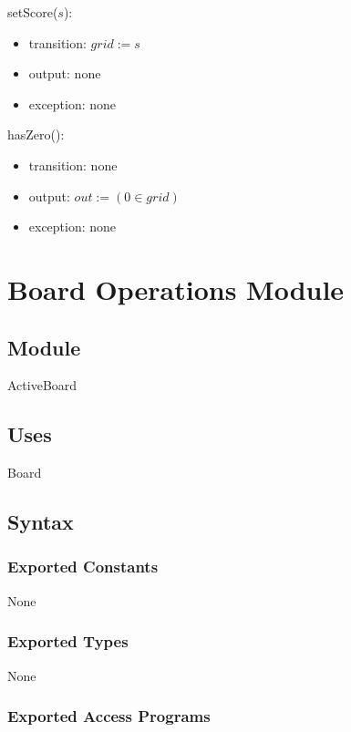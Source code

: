 \documentclass[12pt]{article}
\begin{document}
\noindent setScore($\mathit{s}$):
\begin{itemize}
\item transition: $\mathit{grid} := \mathit{s}$
\item output: none
\item exception: none
\end{itemize}

\noindent hasZero():
\begin{itemize}
\item transition: none
\item output: $\mathit{out} := (0 \in grid)$
\item exception: none
\end{itemize}

\newpage


\section* {Board Operations Module}

\subsection*{Module}

ActiveBoard

\subsection* {Uses}

Board

\subsection* {Syntax}

\subsubsection* {Exported Constants}

None

\subsubsection* {Exported Types}

None

\subsubsection* {Exported Access Programs}
\end{document}
